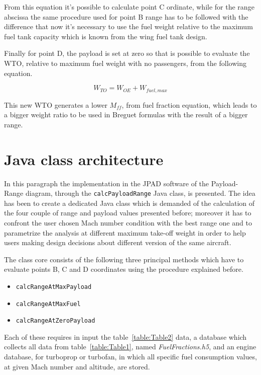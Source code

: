\documentclass[a4paper,12pt,oneside]{book}
\begin{document}
\bigskip
From this equation it’s possible to calculate point C ordinate, while for the range abscissa the same procedure used for point B range has to be followed with the difference that now it’s necessary to use the fuel weight relative to the maximum fuel tank capacity which is known from the wing fuel tank design.
  
Finally for point D, the payload is set at zero so that is possible to evaluate the WTO, relative to maximum fuel weight with no passengers, from the following equation.

\begin{equation}
W_{TO}=W_{OE}+W_{fuel,max}
\label{eqn:Equation1.7}
\end{equation}

\bigskip
This new WTO generates a lower $M_{ff}$, from fuel fraction equation, which leads to a bigger weight ratio to be used in Breguet formulas with the result of a bigger range.

\section{Java class architecture}
In this paragraph the implementation in the JPAD software of the Payload-Range diagram, through the \lstinline[language=Java]!calcPayloadRange! Java class, is presented. The idea has been to create a dedicated Java class which is demanded of the calculation of the four couple of range and payload values presented before; moreover it has to confront the user chosen Mach number condition with the best range one and to parametrize the analysis at different maximum take-off weight in order to help users making design decisions about different version of the same aircraft.

The class core consists of the following three principal methods which have to evaluate points B, C and D coordinates using the procedure explained before.

\begin{itemize}
\item\lstinline[language=Java]!calcRangeAtMaxPayload!
\item\lstinline[language=Java]!calcRangeAtMaxFuel!
\item\lstinline[language=Java]!calcRangeAtZeroPayload!
\end{itemize}

\bigskip
Each of these requires in input the table~\ref{table:Table2} data, a database which collects all data from table~\ref{table:Table1},  named \emph{FuelFractions.h5}, and an engine database, for turboprop or turbofan, in which all specific fuel consumption values, at given Mach number and altitude, are stored.
\end{document}
